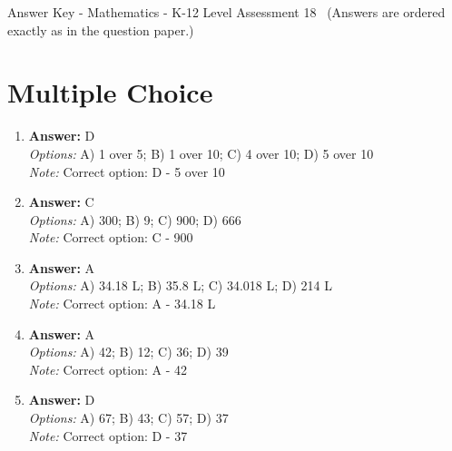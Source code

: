 \documentclass[12pt]{article}
\begin{document}
\begin{center}
Answer Key - Mathematics - K-12 Level Assessment 18 \
\small (Answers are ordered exactly as in the question paper.)
\end{center}

\section*{Multiple Choice}
\begin{enumerate}[label=\arabic*.]
\item \textbf{Answer:} D
\\ \textit{Options:} A) 1 over 5; B) 1 over 10; C) 4 over 10; D) 5 over 10
\\ \textit{Note:} Correct option: D - 5 over 10
\item \textbf{Answer:} C
\\ \textit{Options:} A) 300; B) 9; C) 900; D) 666
\\ \textit{Note:} Correct option: C - 900
\item \textbf{Answer:} A
\\ \textit{Options:} A) 34.18 L; B) 35.8 L; C) 34.018 L; D) 214 L
\\ \textit{Note:} Correct option: A - 34.18 L
\item \textbf{Answer:} A
\\ \textit{Options:} A) 42; B) 12; C) 36; D) 39
\\ \textit{Note:} Correct option: A - 42
\item \textbf{Answer:} D
\\ \textit{Options:} A) 67; B) 43; C) 57; D) 37
\\ \textit{Note:} Correct option: D - 37
\end{enumerate}
\end{document}
